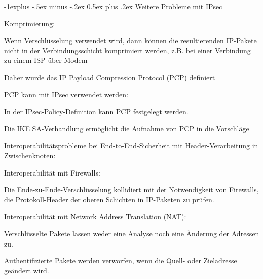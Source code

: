 \documentclass[a4paper]{article}
\makeatletter
\renewcommand{\subsection}{\@startsection{subsection}{2}{0mm}%
 {-1explus -.5ex minus -.2ex}%
 {0.5ex plus .2ex}%
 {\normalfont\normalsize\bfseries}}
\makeatother
\begin{document}
\begin{multicols}{3}
\begin{itemize*}
            \subsection{Weitere Probleme mit
                  IPsec}
            \begin{itemize*}
                  \item       Komprimierung:
                  \begin{itemize*}
                        \item Wenn Verschlüsselung verwendet wird, dann können die resultierenden IP-Pakete nicht in der Verbindungsschicht komprimiert werden, z.B. bei einer Verbindung zu einem ISP über Modem
                        \item Daher wurde das IP Payload Compression Protocol (PCP) definiert
                        \item PCP kann mit IPsec verwendet werden:
                        \begin{itemize*} \item In der IPsec-Policy-Definition kann PCP festgelegt werden. \item Die IKE SA-Verhandlung ermöglicht die Aufnahme von PCP in die Vorschläge \end{itemize*}
                  \end{itemize*}
                  \item       Interoperabilitätsprobleme bei End-to-End-Sicherheit mit
                  Header-Verarbeitung in Zwischenknoten:
                  \begin{itemize*}
                        \item Interoperabilität mit Firewalls:
                        \begin{itemize*} \item Die Ende-zu-Ende-Verschlüsselung kollidiert mit der Notwendigkeit von Firewalls, die Protokoll-Header der oberen Schichten in IP-Paketen zu prüfen. \end{itemize*}
                        \item Interoperabilität mit Network Address Translation (NAT):
                        \begin{itemize*} \item Verschlüsselte Pakete lassen weder eine Analyse noch eine Änderung der Adressen zu. \item Authentifizierte Pakete werden verworfen, wenn die Quell- oder Zieladresse geändert wird. \end{itemize*}
                  \end{itemize*}
            \end{itemize*}


\end{itemize*}
\end{multicols}
\end{document}
